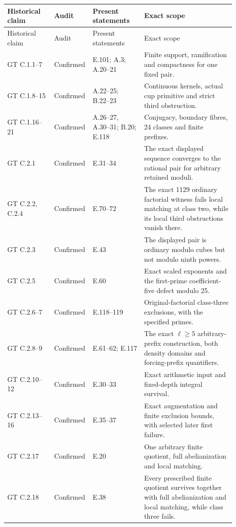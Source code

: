 \begingroup
\small
\setlength{\tabcolsep}{4pt}
\renewcommand{\arraystretch}{1.12}
\begin{longtable}{@{}p{0.20\linewidth}p{0.12\linewidth}p{0.22\linewidth}p{0.39\linewidth}@{}}
\toprule
Historical claim & Audit & Present statements & Exact scope \\
\midrule
\endfirsthead
\toprule
Historical claim & Audit & Present statements & Exact scope \\
\midrule
\endhead
\bottomrule
\endfoot
GT C.1.1--7 & Confirmed & E.101; A.3; A.20--21 & Finite support, ramification and compactness for one fixed pair. \\
GT C.1.8--15 & Confirmed & A.22--25; B.22--23 & Continuous kernels, actual cup primitive and strict third obstruction. \\
GT C.1.16--21 & Confirmed & A.26--27, A.30--31; B.20; E.118 & Conjugacy, boundary fibres, 24 classes and finite prefixes. \\
GT C.2.1 & Confirmed & E.31--34 & The exact displayed sequence converges to the rational pair for arbitrary retained moduli. \\
GT C.2.2, C.2.4 & Confirmed & E.70--72 & The exact 1129 ordinary factorial witness fails local matching at class two, while its local third obstructions vanish there. \\
GT C.2.3 & Confirmed & E.43 & The displayed pair is ordinary modulo cubes but not modulo ninth powers. \\
GT C.2.5 & Confirmed & E.60 & Exact scaled exponents and the first-prime coefficient-five defect modulo 25. \\
GT C.2.6--7 & Confirmed & E.118--119 & Original-factorial class-three exclusions, with the specified primes. \\
GT C.2.8--9 & Confirmed & E.61--62; E.117 & The exact \(\ell\ge5\) arbitrary-prefix construction, both density domains and forcing-prefix quantifiers. \\
GT C.2.10--12 & Confirmed & E.30--33 & Exact arithmetic input and fixed-depth integral survival. \\
GT C.2.13--16 & Confirmed & E.35--37 & Exact augmentation and finite exclusion bounds, with selected later first failure. \\
GT C.2.17 & Confirmed & E.20 & One arbitrary finite quotient, full abelianization and local matching. \\
GT C.2.18 & Confirmed & E.38 & Every prescribed finite quotient survives together with full abelianization and local matching, while class three fails. \\

\end{longtable}

